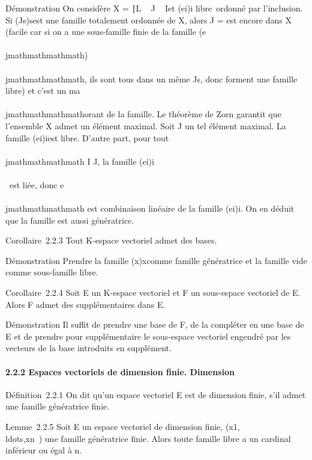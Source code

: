 Démonstration On considère X =
\J∣L \subset~ J \subset~
I\text et
(ei)i\inJ\text
libre\ ordonné par l'inclusion. Si
(Js)s\inS est une famille totalement ordonnée de X,
alors J = \cups\inSJs est encore dans X (facile car si on
a une sous-famille finie de la famille (e\\\\jmathmathmathmath)\\\\jmathmathmathmath\inJ, ils
sont tous dans un même Js, donc forment une famille libre) et
c'est un ma\\\\jmathmathmathmathorant de la famille. Le théorème de Zorn garantit que
l'ensemble X admet un élément maximal. Soit J un tel élément maximal. La
famille (ei)i\inJ est libre. D'autre part, pour tout \\\\jmathmathmathmath
\in I \diagdown J, la famille
(ei)i\inI\cup\\\\\jmathmathmathmath\ est
liée, donc e\\\\jmathmathmathmath est combinaison linéaire de la famille
(ei)i\inJ. On en déduit que la famille est aussi
génératrice.

Corollaire~2.2.3 Tout K-espace vectoriel admet des bases.

Démonstration Prendre la famille (x)x\inE comme famille
génératrice et la famille vide comme sous-famille libre.

Corollaire~2.2.4 Soit E un K-espace vectoriel et F un sous-espace
vectoriel de E. Alors F admet des supplémentaires dans E.

Démonstration Il suffit de prendre une base de F, de la compléter en une
base de E et de prendre pour supplémentaire le sous-espace vectoriel
engendré par les vecteurs de la base introduits en supplément.

\paragraph{2.2.2 Espaces vectoriels de dimension finie. Dimension}

Définition~2.2.1 On dit qu'un espace vectoriel E est de dimension finie,
s'il admet une famille génératrice finie.

Lemme~2.2.5 Soit E un espace vectoriel de dimension finie,
(x1,\\ldots,xn~)
une famille génératrice finie. Alors toute famille libre a un cardinal
inférieur ou égal à n.

